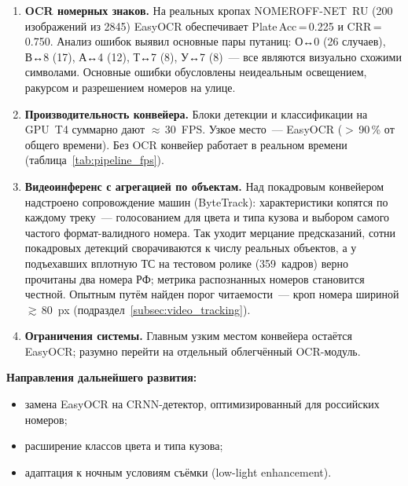 \documentclass[10pt,a4paper]{report}
\numberwithin{equation}{chapter}
\numberwithin{figure}{chapter}
\numberwithin{table}{chapter}
\begin{document}
\begin{enumerate}
  \item \textbf{OCR номерных знаков.}
        На реальных кропах NOMEROFF-NET~RU (200 изображений из 2845)
        EasyOCR обеспечивает Plate\,Acc\,=\,0.225 и CRR\,=\,0.750.
        Анализ ошибок выявил
        основные пары путаниц: О↔0 (26 случаев), В↔8 (17), А↔4 (12),
        Т↔7 (8), У↔7 (8)~--- все являются визуально схожими символами.
        Основные ошибки обусловлены
        неидеальным освещением, ракурсом и разрешением номеров на улице.

  \item \textbf{Производительность конвейера.}
        Блоки детекции и классификации на GPU~T4 суммарно дают
        $\approx$\,30~FPS. Узкое место~--- EasyOCR ($>$\,90\,\%
        от общего времени). Без OCR конвейер работает в реальном
        времени (таблица~\ref{tab:pipeline_fps}).

  \item \textbf{Видеоинференс с агрегацией по объектам.}
        Над покадровым конвейером надстроено сопровождение машин
        (ByteTrack): характеристики копятся по каждому треку~---
        голосованием для цвета и типа кузова и выбором самого частого
        формат-валидного номера. Так уходит мерцание предсказаний, сотни
        покадровых детекций сворачиваются к числу реальных объектов, а у
        подъехавших вплотную ТС на тестовом ролике (359~кадров) верно
        прочитаны два номера РФ; метрика распознанных
        номеров становится честной. Опытным путём найден порог
        читаемости~--- кроп номера шириной $\gtrsim$\,80~px
        (подраздел~\ref{subsec:video_tracking}).

  \item \textbf{Ограничения системы.}
        Главным узким местом конвейера остаётся EasyOCR; разумно
        перейти на отдельный облегчённый OCR-модуль.
\end{enumerate}

\textbf{Направления дальнейшего развития:}
\begin{itemize}[nosep]
  \item замена EasyOCR на CRNN-детектор, оптимизированный для российских номеров;
  \item расширение классов цвета и типа кузова;
  \item адаптация к ночным условиям съёмки (low-light enhancement).
\end{itemize}
\end{document}
